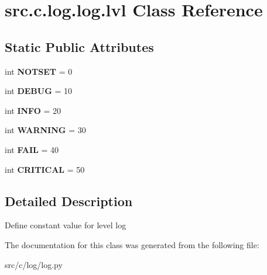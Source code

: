\hypertarget{classsrc_1_1c_1_1log_1_1log_1_1lvl}{}\section{src.\+c.\+log.\+log.\+lvl Class Reference}
\label{classsrc_1_1c_1_1log_1_1log_1_1lvl}
\subsection*{Static Public Attributes}
\begin{DoxyCompactItemize}
\item 
\hypertarget{classsrc_1_1c_1_1log_1_1log_1_1lvl_aa64d1a6e06442b9b1488226b27b2b470}{}int {\bfseries N\+O\+T\+S\+E\+T} = 0\label{classsrc_1_1c_1_1log_1_1log_1_1lvl_aa64d1a6e06442b9b1488226b27b2b470}

\item 
\hypertarget{classsrc_1_1c_1_1log_1_1log_1_1lvl_a39858d6fbb09f31f41e3d5cac3a75704}{}int {\bfseries D\+E\+B\+U\+G} = 10\label{classsrc_1_1c_1_1log_1_1log_1_1lvl_a39858d6fbb09f31f41e3d5cac3a75704}

\item 
\hypertarget{classsrc_1_1c_1_1log_1_1log_1_1lvl_ab68f28a1b2fc4137ce73b79bda6752da}{}int {\bfseries I\+N\+F\+O} = 20\label{classsrc_1_1c_1_1log_1_1log_1_1lvl_ab68f28a1b2fc4137ce73b79bda6752da}

\item 
\hypertarget{classsrc_1_1c_1_1log_1_1log_1_1lvl_a7e733c32c4307372a558071dbd8f614e}{}int {\bfseries W\+A\+R\+N\+I\+N\+G} = 30\label{classsrc_1_1c_1_1log_1_1log_1_1lvl_a7e733c32c4307372a558071dbd8f614e}

\item 
\hypertarget{classsrc_1_1c_1_1log_1_1log_1_1lvl_a850333e5877e2bc88965ac8f784cb085}{}int {\bfseries F\+A\+I\+L} = 40\label{classsrc_1_1c_1_1log_1_1log_1_1lvl_a850333e5877e2bc88965ac8f784cb085}

\item 
\hypertarget{classsrc_1_1c_1_1log_1_1log_1_1lvl_a399e3c25975af4cfc89c8f45d27dfe36}{}int {\bfseries C\+R\+I\+T\+I\+C\+A\+L} = 50\label{classsrc_1_1c_1_1log_1_1log_1_1lvl_a399e3c25975af4cfc89c8f45d27dfe36}

\end{DoxyCompactItemize}


\subsection{Detailed Description}
\begin{DoxyVerb}Define constant value for level log
\end{DoxyVerb}
 

The documentation for this class was generated from the following file\+:\begin{DoxyCompactItemize}
\item 
src/c/log/log.\+py\end{DoxyCompactItemize}
